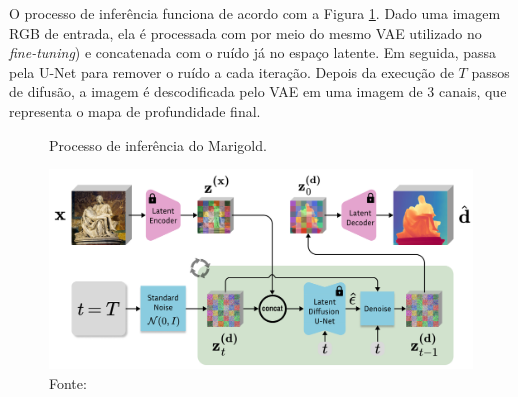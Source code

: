 O processo de inferência funciona de acordo com a Figura \ref{mariinfe}. Dado uma imagem RGB de entrada, ela é processada com por meio do mesmo VAE utilizado no \textit{fine-tuning}) e concatenada com o ruído já no espaço latente. Em seguida, passa pela U-Net para remover o ruído a cada iteração. Depois da execução de $T$ passos de difusão, a imagem é descodificada pelo VAE em uma imagem de 3 canais, que representa o mapa de profundidade final. 

\begin{figure}[h]
    \centering
    \caption{Processo de inferência do Marigold.}
    \includegraphics[width=.8\textwidth]{fig/mariouro2.png}
    \caption*{Fonte: }
    \label{mariinfe}
\end{figure}